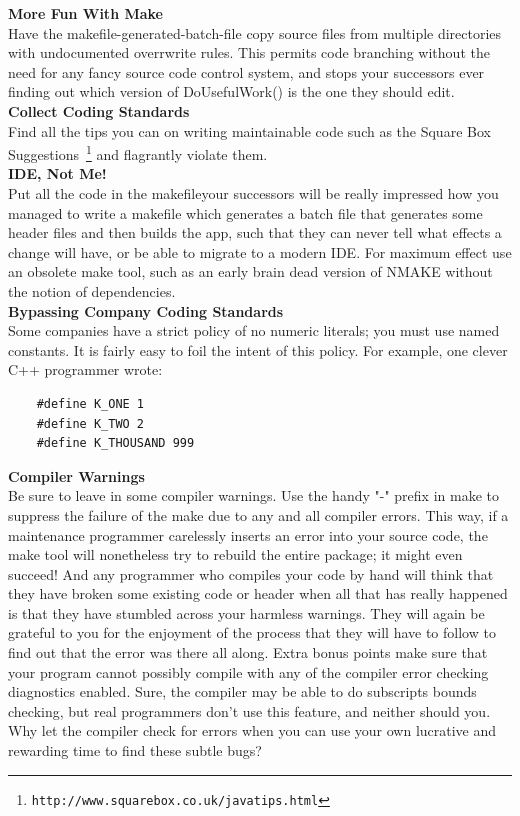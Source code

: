 \documentclass[11pt,twoside,a4paper]{article}
\begin{document}
\textbf{More Fun With Make}~\\
Have the makefile-generated-batch-file copy source files from multiple directories with undocumented overrwrite rules. This permits code branching without the need for any fancy source code control system, and stops your successors ever finding out which version of DoUsefulWork() is the one they should edit. ~\\

\textbf{Collect Coding Standards}~\\
Find all the tips you can on writing maintainable code such as the Square Box Suggestions~\footnote{\texttt{http://www.squarebox.co.uk/javatips.html}} and flagrantly violate them. ~\\

\textbf{IDE, Not Me!}~\\
Put all the code in the makefileyour successors will be really impressed how you managed to write a makefile which generates a batch file that generates some header files and then builds the app, such that they can never tell what effects a change will have, or be able to migrate to a modern IDE. For maximum effect use an obsolete make tool, such as an early brain dead version of NMAKE without the notion of dependencies. ~\\

\textbf{Bypassing Company Coding Standards}~\\
Some companies have a strict policy of no numeric literals; you must use named constants. It is fairly easy to foil the intent of this policy. For example, one clever C++ programmer wrote: 
\begin{verbatim}
	#define K_ONE 1 
	#define K_TWO 2 
	#define K_THOUSAND 999 
\end{verbatim}

\textbf{Compiler Warnings}~\\
Be sure to leave in some compiler warnings. Use the handy "-" prefix in make to suppress the failure of the make due to any and all compiler errors. This way, if a maintenance programmer carelessly inserts an error into your source code, the make tool will nonetheless try to rebuild the entire package; it might even succeed! And any programmer who compiles your code by hand will think that they have broken some existing code or header when all that has really happened is that they have stumbled across your harmless warnings. They will again be grateful to you for the enjoyment of the process that they will have to follow to find out that the error was there all along. Extra bonus points make sure that your program cannot possibly compile with any of the compiler error checking diagnostics enabled. Sure, the compiler may be able to do subscripts bounds checking, but real programmers don't use this feature, and neither should you. Why let the compiler check for errors when you can use your own lucrative and rewarding time to find these subtle bugs? ~\\
\end{document}
